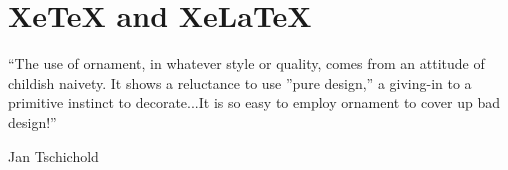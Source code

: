 
\def\reflect#1{{\setbox0=\hbox{#1}\rlap{\kern0.5\wd0
  \special{x:gsave}\special{x:scale -1 1}}\box0 \special{x:grestore}}}
\def\XeTeX{\leavevmode
  \setbox0=\hbox{X\lower.5ex\hbox{\kern-.15em\reflect{E}}\kern-.1667em \TeX}%
  \dp0=0pt\ht0=0pt\box0 }

\def\eTeX{$\varepsilon$-\TeX}
\def\TeXgX{\TeX\lower.5ex\hbox{\kern-.15em G}\kern-.25em X}
\def\extractfontname"#1"#2\relax{\edef\testa{#1}}
\def\checkfont#1#2{^^A
  \ifx#1\nullfont \message{Font "#2" not available!}\rm \else \edef\testb{\detokenize{#2}}%
  \let\x=#1\x \edef\testa{\fontname\x}\expandafter\extractfontname\testa\relax
  \ifx\testa\testb\else\errmessage{Loaded font "\testa", expected "\testb"!}\fi\fi}

\def\showfont#1#2{\tt #1&
  \edef\INT{\the\interactionmode}\interactionmode=0
  \font\x=#1 \interactionmode=\INT \relax \checkfont{\x}{#2}#2\cr}



\chapter{XeTeX and XeLaTeX}

\epigraph{“The use of ornament, in whatever style or quality, comes from an attitude of childish naivety. It shows a 
reluctance to use ”pure design,” a giving-in to a primitive instinct to decorate...It is so easy to employ ornament 
to cover up bad design!”}{Jan Tschichold}



